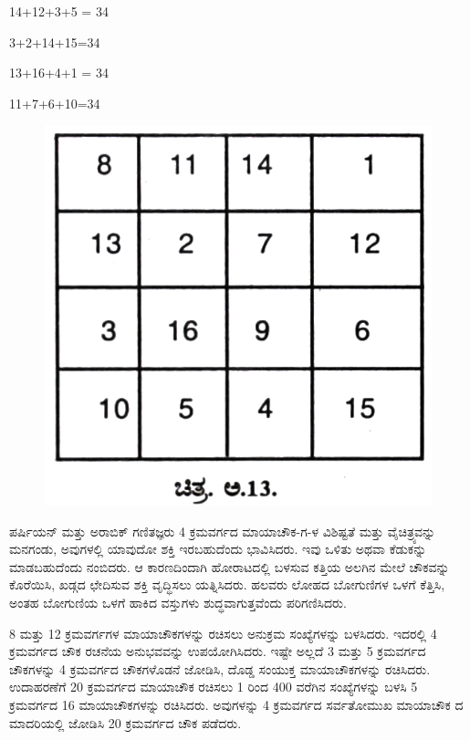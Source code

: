 14+12+3+5 = 34

3+2+14+15=34

13+16+4+1 = 34

11+7+6+10=34
\begin{figure}[H]
\includegraphics{src/figures/chap9/fig9.9.jpg}
\end{figure}

ಪರ್ಷಿಯನ್ ಮತ್ತು ಅರಾಬಿಕ್ ಗಣಿತಜ್ಞರು 4 ಕ್ರಮವರ್ಗದ ಮಾಯಾಚೌಕ-ಗ-ಳ ವಿಶಿಷ್ಟತೆ ಮತ್ತು ವೈಚಿತ್ರ್ಯವನ್ನು ಮನಗಂಡು, ಅವುಗಳಲ್ಲಿ ಯಾವುದೋ ಶಕ್ತಿ ಇರಬಹುದೆಂದು ಭಾವಿಸಿದರು. ಇವು ಒಳಿತು ಅಥವಾ ಕೆಡುಕನ್ನು ಮಾಡಬಹುದೆಂದು ನಂಬಿದರು. ಆ ಕಾರಣದಿಂದಾಗಿ ಹೋರಾಟದಲ್ಲಿ ಬಳಸುವ ಕತ್ತಿಯ ಅಲಗಿನ ಮೇಲೆ ಚೌಕವನ್ನು ಕೊರೆಯಿಸಿ, ಖಡ್ಗದ ಛೇದಿಸುವ ಶಕ್ತಿ ವೃದ್ಧಿಸಲು ಯತ್ನಿಸಿದರು. ಹಲವರು ಲೋಹದ ಬೋಗುಣಿಗಳ ಒಳಗೆ ಕೆತ್ತಿಸಿ, ಅಂತಹ ಬೋಗುಣಿಯ ಒಳಗೆ ಹಾಕಿದ ವಸ್ತುಗಳು ಶುದ್ಧವಾಗುತ್ತವೆಂದು ಪರಿಗಣಿಸಿದರು.

8 ಮತ್ತು 12 ಕ್ರಮವರ್ಗಗಳ ಮಾಯಾಚೌಕಗಳನ್ನು ರಚಿಸಲು ಅನುಕ್ರಮ ಸಂಖ್ಯೆಗಳನ್ನು ಬಳಸಿದರು. ಇದರಲ್ಲಿ 4 ಕ್ರಮವರ್ಗದ ಚೌಕ ರಚನೆಯ ಅನುಭವವನ್ನು ಉಪಯೋಗಿಸಿದರು. ಇಷ್ಟೇ ಅಲ್ಲದೆ 3 ಮತ್ತು 5 ಕ್ರಮವರ್ಗದ ಚೌಕಗಳನ್ನು 4 ಕ್ರಮವರ್ಗದ ಚೌಕಗಳೊಡನೆ ಜೋಡಿಸಿ, ದೊಡ್ಡ ಸಂಯುಕ್ತ ಮಾಯಾಚೌಕಗಳನ್ನು ರಚಿಸಿದರು. ಉದಾಹರಣೆಗೆ 20 ಕ್ರಮವರ್ಗದ ಮಾಯಾಚೌಕ ರಚಿಸಲು 1 ರಿಂದ 400 ವರೆಗಿನ ಸಂಖ್ಯೆಗಳನ್ನು ಬಳಸಿ 5 ಕ್ರಮವರ್ಗದ 16 ಮಾಯಾಚೌಕಗಳನ್ನು ರಚಿಸಿದರು. ಅವುಗಳನ್ನು 4 ಕ್ರಮವರ್ಗದ ಸರ್ವತೋಮುಖ ಮಾಯಾಚೌಕ ದ ಮಾದರಿಯಲ್ಲಿ ಜೋಡಿಸಿ 20 ಕ್ರಮವರ್ಗದ ಚೌಕ ಪಡೆದರು.

